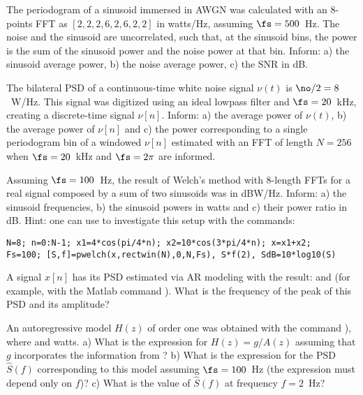 \begin{exercises}
\item The periodogram of a sinusoid immersed in AWGN was calculated with an $8$-points FFT as
$[2,2,2,6,2,6,2,2]$ in watts/Hz, assuming $\fs=500$~Hz. The noise and the sinusoid are uncorrelated, such that, at the sinusoid bins, the power is the sum of the sinusoid power and the noise power at that bin. Inform: a) the sinusoid average power, b) the noise average power, c) the SNR in dB.

\item The bilateral PSD of a continuous-time white noise signal $\nu(t)$ is $\no/2=8$~W/Hz. This signal was digitized using an ideal lowpass filter and $\fs=20$~kHz, creating a discrete-time signal $\nu[n]$. Inform: a) the average power of $\nu(t)$, b) the average power of $\nu[n]$ and c) the power corresponding to a single periodogram bin of a windowed $\nu[n]$ estimated with an FFT of length $N=256$ when $\fs=20$~kHz and $\fs=2 \pi$ are informed.

\item Assuming $\fs=100$~Hz, the result of Welch's method with 8-length FFTs for a real signal composed by a sum of two sinusoids was  in dBW/Hz. Inform: a) the sinusoid frequencies, b) the sinusoid powers in watts and c) their power ratio in dB.
Hint: one can use {\matlab} to investigate this setup with the commands:
\begin{lstlisting}
N=8; n=0:N-1; x1=4*cos(pi/4*n); x2=10*cos(3*pi/4*n); x=x1+x2;
Fs=100; [S,f]=pwelch(x,rectwin(N),0,N,Fs), S*f(2), SdB=10*log10(S)
\end{lstlisting}

\item A signal $x[n]$ has its PSD estimated via AR modeling with the result:
 and  (for example, with the Matlab command ). What is the frequency of the peak of this PSD and its amplitude?

\item An autoregressive model $H(z)$ of order one was obtained with the command ), where  and  watts. a) What is the expression for $H(z)=g/A(z)$ assuming that $g$ incorporates the information from ? b) What is the expression for the PSD $\hat S(f)$ corresponding to this model assuming $\fs=100$~Hz (the expression must depend only on $f$)? c) What is the value of $\hat S(f)$ at frequency $f=2$~Hz?


\end{exercises}
